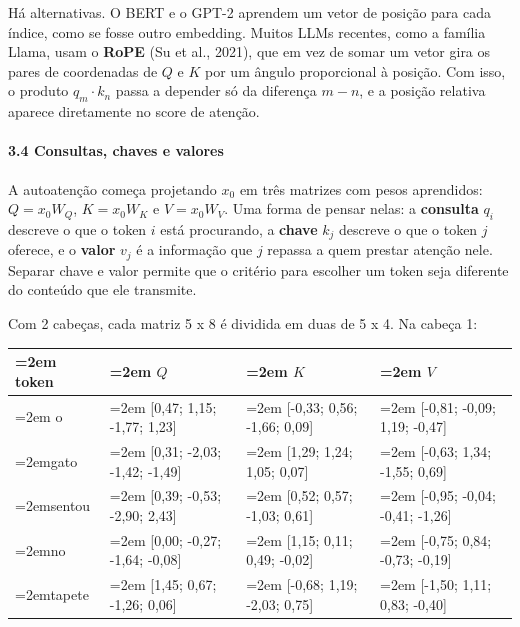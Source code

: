 \documentclass[12pt, a4paper]{article}
\begin{document}
Há alternativas. O BERT e o GPT-2 aprendem um vetor de posição para cada índice, como se fosse outro embedding. Muitos LLMs recentes, como a família Llama, usam o \textbf{RoPE} (Su et al., 2021), que em vez de somar um vetor gira os pares de coordenadas de \(Q\) e \(K\) por um ângulo proporcional à posição. Com isso, o produto \(q_m \cdot k_n\) passa a depender só da diferença \(m-n\), e a posição relativa aparece diretamente no score de atenção.

\paragraph{3.4 Consultas, chaves e valores}\label{34-consultas-chaves-e-valores}

A autoatenção começa projetando \(x_0\) em três matrizes com pesos aprendidos: \(Q = x_0 W_Q\), \(K = x_0 W_K\) e \(V = x_0 W_V\). Uma forma de pensar nelas: a \textbf{consulta} \(q_i\) descreve o que o token \(i\) está procurando, a \textbf{chave} \(k_j\) descreve o que o token \(j\) oferece, e o \textbf{valor} \(v_j\) é a informação que \(j\) repassa a quem prestar atenção nele. Separar chave e valor permite que o critério para escolher um token seja diferente do conteúdo que ele transmite.

Com 2 cabeças, cada matriz 5 x 8 é dividida em duas de 5 x 4. Na cabeça 1:

\begingroup
\setlength{\tabcolsep}{4.0pt}
\begin{longtable}{@{}>{\raggedright\hyphenpenalty=30\tolerance=999\emergencystretch=2em\arraybackslash}p{1.41cm}>{\raggedright\hyphenpenalty=30\tolerance=999\emergencystretch=2em\arraybackslash}p{4.31cm}>{\raggedright\hyphenpenalty=30\tolerance=999\emergencystretch=2em\arraybackslash}p{4.21cm}>{\raggedright\hyphenpenalty=30\tolerance=999\emergencystretch=2em\arraybackslash}p{4.51cm}@{}}
\toprule\noalign{}
token & \(Q\) & \(K\) & \(V\) \\
\midrule\noalign{}
\endhead
\bottomrule\noalign{}
\endlastfoot
o & {[}0,47; 1,15; -1,77; 1,23{]} & {[}-0,33; 0,56; -1,66; 0,09{]} & {[}-0,81; -0,09; 1,19; -0,47{]} \\
gato & {[}0,31; -2,03; -1,42; -1,49{]} & {[}1,29; 1,24; 1,05; 0,07{]} & {[}-0,63; 1,34; -1,55; 0,69{]} \\
sentou & {[}0,39; -0,53; -2,90; 2,43{]} & {[}0,52; 0,57; -1,03; 0,61{]} & {[}-0,95; -0,04; -0,41; -1,26{]} \\
no & {[}0,00; -0,27; -1,64; -0,08{]} & {[}1,15; 0,11; 0,49; -0,02{]} & {[}-0,75; 0,84; -0,73; -0,19{]} \\
tapete & {[}1,45; 0,67; -1,26; 0,06{]} & {[}-0,68; 1,19; -2,03; 0,75{]} & {[}-1,50; 1,11; 0,83; -0,40{]} \\
\end{longtable}
\endgroup
\end{document}
